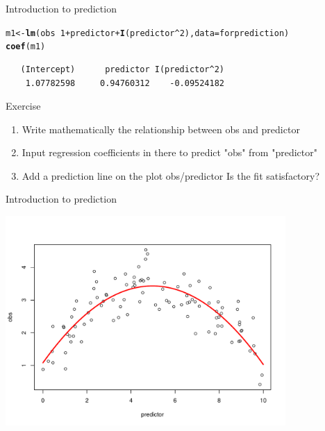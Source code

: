 \documentclass[10pt]{beamer}\usepackage[]{graphicx}\usepackage[]{color}
\makeatletter
\newcommand{\hlnum}[1]{\textcolor[rgb]{0.686,0.059,0.569}{#1}}%
\newcommand{\hlopt}[1]{\textcolor[rgb]{0,0,0}{#1}}%
\newcommand{\hlstd}[1]{\textcolor[rgb]{0.345,0.345,0.345}{#1}}%
\newcommand{\hlkwb}[1]{\textcolor[rgb]{0.69,0.353,0.396}{#1}}%
\newcommand{\hlkwc}[1]{\textcolor[rgb]{0.333,0.667,0.333}{#1}}%
\newcommand{\hlkwd}[1]{\textcolor[rgb]{0.737,0.353,0.396}{\textbf{#1}}}%
\newenvironment{kframe}{%
 \def\at@end@of@kframe{}%
 \ifinner\ifhmode%
  \def\at@end@of@kframe{\end{minipage}}%
  \begin{minipage}{\columnwidth}%
 \fi\fi%
 \def\FrameCommand##1{\hskip\@totalleftmargin \hskip-\fboxsep
 \colorbox{shadecolor}{##1}\hskip-\fboxsep
     \hskip-\linewidth \hskip-\@totalleftmargin \hskip\columnwidth}%
 \MakeFramed {\advance\hsize-\width
   \@totalleftmargin\z@ \linewidth\hsize
   \@setminipage}}%
 {\par\unskip\endMakeFramed%
 \at@end@of@kframe}
\newenvironment{knitrout}{}{} %
\makeatother
\begin{document}
\begin{frame}[fragile]{Introduction to prediction}

\begin{knitrout}\small
{}\color{fgcolor}\begin{kframe}
\begin{alltt}
\hlstd{m1} \hlkwb{<-} \hlkwd{lm}\hlstd{(obs} \hlopt{~} \hlnum{1} \hlopt{+} \hlstd{predictor} \hlopt{+} \hlkwd{I}\hlstd{(predictor}\hlopt{^}\hlnum{2}\hlstd{),} \hlkwc{data}\hlstd{=forprediction)}
\hlkwd{coef}\hlstd{(m1)}
\end{alltt}
\begin{verbatim}
   (Intercept)      predictor I(predictor^2) 
    1.07782598     0.94760312    -0.09524182 
\end{verbatim}
\end{kframe}
\end{knitrout}
  
  \begin{alertblock}{Exercise}
    \begin{enumerate}
      \item Write mathematically the relationship between obs and predictor
      \item Input regression coefficients in there to predict "obs" from "predictor"
      \item Add a prediction line on the plot obs/predictor
    Is the fit satisfactory?
    \end{enumerate}
  \end{alertblock}
\end{frame}

\begin{frame}[fragile]{Introduction to prediction}



\begin{knitrout}\small
{}\color{fgcolor}
\includegraphics[width=0.8\textwidth,height=0.6\textwidth]{figure/unnamed-chunk-14-1} 

\end{knitrout}
\end{frame}
\end{document}
